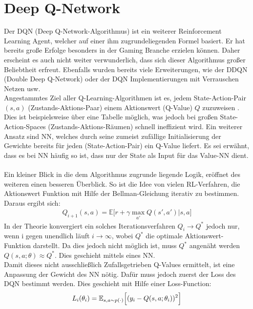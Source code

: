 \section{Deep Q-Network} \label{sec:Q-Learning}
Der DQN (Deep Q-Network-Algorithmus) ist ein weiterer Reinforcement Learning Agent, welcher auf einer ihm zugrundeliegenden Formel basiert. Er hat bereits große Erfolge besonders in der Gaming Branche erzielen können. Daher erscheint es auch nicht weiter verwunderlich, dass sich dieser Algorithmus großer Beliebtheit erfreut. Ebenfalls wurden bereits viele Erweiterungen, wie der DDQN (Double Deep Q-Network) oder der DQN Implementierungen mit Verrauschen Netzen usw.\\
Angestammtes Ziel aller Q-Learning-Algorithmen ist es, jedem State-Action-Pair $(s,a)$ (Zustands-Aktions-Paar) einem Aktionswert (Q-Value) $Q$ zuzuweisen \cite[S. 126]{DRL_Lapan}. Dies ist beispielsweise über eine Tabelle möglich, was jedoch bei großen State-Action-Spaces (Zustands-Aktions-Räumen) schnell ineffizient wird. Ein weiterer Ansatz sind NN, welches durch seine zumeist zufällige Initialisierung der Gewichte bereits für jeden (State-Action-Pair) ein Q-Value liefert. Es sei erwähnt, dass es bei NN häufig so ist, dass nur der State als Input für das Value-NN dient.\\
\\Ein kleiner Blick in die dem Algorithmus zugrunde liegende Logik, eröffnet des weiteren einen besseren Überblick. So ist die Idee von vielen RL-Verfahren, die Aktionswert Funktion mit Hilfe der Bellman-Gleichung iterativ zu bestimmen. Daraus ergibt sich:
\begin{align}
	Q_{i+1}(s,a) = \mathbb{E} \bigl\lbrack r + \gamma \max_{a'} Q(s',a')|s,a \bigr\rbrack
\end{align}
In der Theorie konvergiert ein solches Iterationsverfahren $Q_i \longrightarrow Q^*$ jedoch nur, wenn i gegen unendlich läuft $i \longrightarrow \infty$, wobei $Q^*$ die optimale Aktionswert-Funktion darstellt. Da dies jedoch nicht möglich ist, muss $Q^*$ angenäht werden $Q(s,a;\theta) \approx Q^* $. Dies geschieht mittels eines NN.\\
Damit dieses nicht ausschließlich Zufallsgetrieben Q-Values ermittelt, ist eine Anpassung der Gewicht des NN nötig. Dafür muss jedoch zuerst der Loss des DQN bestimmt werden. Dies geschieht mit Hilfe einer Loss-Function:
\begin{align}
	\label{eq:DQN_Loss}
	L_i(\theta_i) = \mathbb{E}_{s,a \sim p(\cdot)} \Bigl\lbrack (y_i - Q(s,a;\theta_i))^2 \Bigr\rbrack
\end{align}
